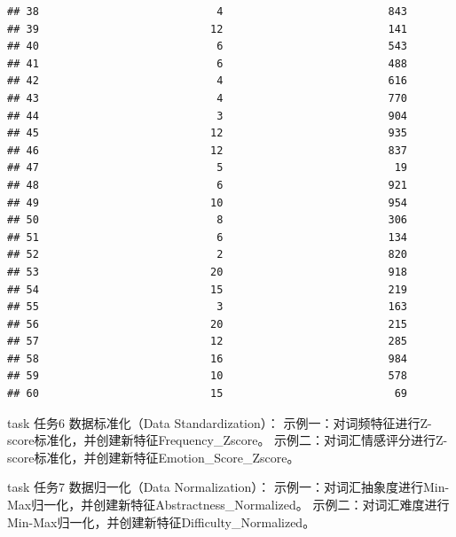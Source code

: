 \documentclass[]{book}
\newenvironment{Shaded}{\begin{snugshade}}{\end{snugshade}}
\newcommand{\CommentTok}[1]{\textcolor[rgb]{0.56,0.35,0.01}{\textit{#1}}}
\newcommand{\DataTypeTok}[1]{\textcolor[rgb]{0.13,0.29,0.53}{#1}}
\newcommand{\KeywordTok}[1]{\textcolor[rgb]{0.13,0.29,0.53}{\textbf{#1}}}
\newcommand{\NormalTok}[1]{#1}
\newcommand{\OperatorTok}[1]{\textcolor[rgb]{0.81,0.36,0.00}{\textbf{#1}}}
\newcommand{\StringTok}[1]{\textcolor[rgb]{0.31,0.60,0.02}{#1}}
\begin{document}
\begin{verbatim}
## 38                            4                          843
## 39                           12                          141
## 40                            6                          543
## 41                            6                          488
## 42                            4                          616
## 43                            4                          770
## 44                            3                          904
## 45                           12                          935
## 46                           12                          837
## 47                            5                           19
## 48                            6                          921
## 49                           10                          954
## 50                            8                          306
## 51                            6                          134
## 52                            2                          820
## 53                           20                          918
## 54                           15                          219
## 55                            3                          163
## 56                           20                          215
## 57                           12                          285
## 58                           16                          984
## 59                           10                          578
## 60                           15                           69
\end{verbatim}

\begin{infobox}task
任务6
数据标准化（Data Standardization）：
示例一：对词频特征进行Z-score标准化，并创建新特征Frequency\_Zscore。
示例二：对词汇情感评分进行Z-score标准化，并创建新特征Emotion\_Score\_Zscore。

\end{infobox}

\begin{Shaded}
\end{Shaded}

\begin{infobox}task
任务7
数据归一化（Data Normalization）：
示例一：对词汇抽象度进行Min-Max归一化，并创建新特征Abstractness\_Normalized。
示例二：对词汇难度进行Min-Max归一化，并创建新特征Difficulty\_Normalized。

\end{infobox}
\end{document}
